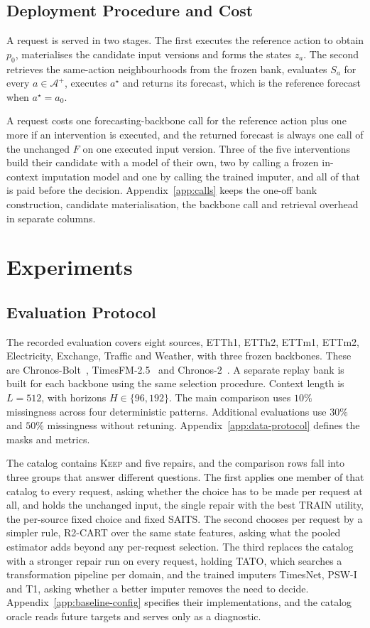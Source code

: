 \documentclass{article}
\newcommand{\calA}{\mathcal{A}}
\begin{document}
\subsection{Deployment Procedure and Cost}
\label{sec:method-deploy}
A request is served in two stages. The first executes the reference action to obtain $p_0$,
materialises the candidate input versions and forms the states $z_a$. The second retrieves the
same-action neighbourhoods from the frozen bank, evaluates $S_a$ for every $a \in \calA^{+}$,
executes $a^{\star}$ and returns its forecast, which is the reference forecast when
$a^{\star} = a_0$.

A request costs one forecasting-backbone call for the reference action plus one more if an
intervention is executed, and the returned forecast is always one call of the unchanged $F$ on
one executed input version. Three of the five interventions build their candidate with a model
of their own, two by calling a frozen in-context imputation model and one by calling the
trained imputer, and all of that is paid before the decision.
Appendix~\ref{app:calls} keeps the one-off bank construction, candidate materialisation, the
backbone call and retrieval overhead in separate columns.

\section{Experiments}
\label{sec:exp}

\subsection{Evaluation Protocol}
\label{sec:exp-setup}
The recorded evaluation covers eight sources, ETTh1, ETTh2, ETTm1, ETTm2, Electricity,
Exchange, Traffic and Weather, with three frozen backbones. These are
Chronos-Bolt~\citep{chronosbolt2025}, TimesFM-2.5~\citep{das2024timesfm} and
Chronos-2~\citep{chronos2_2025}. A separate replay bank is built for each backbone using the
same selection procedure. Context length is $L=512$, with horizons $H \in \{96,192\}$.
The main comparison uses $10\%$ missingness across four deterministic patterns.
Additional evaluations use $30\%$ and $50\%$ missingness without retuning.
Appendix~\ref{app:data-protocol} defines the masks and metrics.

The catalog contains \textsc{Keep} and five repairs, and the comparison rows fall into three
groups that answer different questions. The first applies one member of that catalog to every
request, asking whether the choice has to be made per request at all, and holds the unchanged
input, the single repair with the best TRAIN utility, the per-source fixed choice and fixed
SAITS. The second chooses per request by a simpler rule, R2-CART over the same state
features, asking what the pooled estimator adds beyond any per-request selection. The third
replaces the catalog with a stronger repair run on every request, holding TATO, which
searches a transformation pipeline per domain, and the trained imputers TimesNet, PSW-I and
T1, asking whether a better imputer removes the need to decide.
Appendix~\ref{app:baseline-config} specifies their implementations, and the catalog oracle
reads future targets and serves only as a diagnostic.
\end{document}
